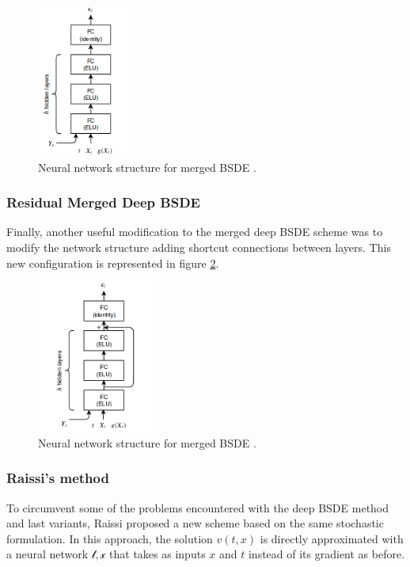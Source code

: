 \begin{figure}[H]
	\centering
	\includegraphics[width=0.4\linewidth,height=5cm]{images/MergedStructure}
	\caption{Neural network structure for merged BSDE \cite{chan-wai-nam_machine_2018}.}
	\label{fig:MergedStructure}
\end{figure}
\subsubsection*{Residual Merged Deep BSDE}
Finally, another useful modification to the merged deep BSDE scheme was to modify the network structure adding shortcut connections between layers. This new configuration is represented in figure \ref{fig:ResidualMergedStructure}.
\begin{figure}[H]
	\centering
	\includegraphics[width=0.4\linewidth,height=5cm]{images/ResidualMergedStructure}
	\caption{Neural network structure for merged BSDE \cite{chan-wai-nam_machine_2018}.}
	\label{fig:ResidualMergedStructure}
\end{figure}
\subsubsection*{Raissi's method}
To circumvent some of the problems encountered with the deep BSDE method and last variants, Raissi \cite{raissi_forward-backward_2018} proposed a new scheme based on the same stochastic formulation. In this approach, the solution $v(t,x)$ is directly approximated with a neural network $\mathcal{t,x}$ that takes as inputs $x$ and $t$ instead of its gradient as before. 

